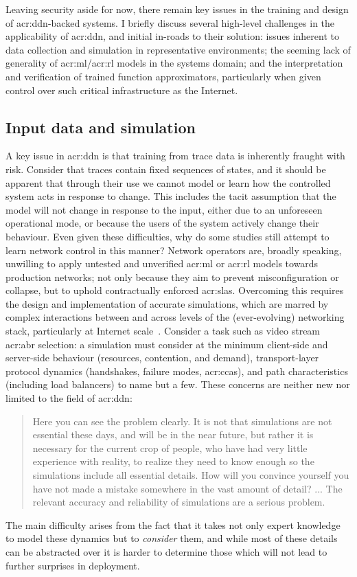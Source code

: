 Leaving security aside for now, there remain key issues in the training and design of \gls{acr:ddn}-backed systems.
I briefly discuss several high-level challenges in the applicability of \gls{acr:ddn}, and initial in-roads to their solution: issues inherent to data collection and simulation in representative environments; the seeming lack of generality of \gls{acr:ml}/\gls{acr:rl} models in the systems domain; and the interpretation and verification of trained function approximators, particularly when given control over such critical infrastructure as the Internet.

\subsection{Input data and simulation}
A key issue in \gls{acr:ddn} is that training from trace data is inherently fraught with risk.
Consider that traces contain fixed sequences of states, and it should be apparent that through their use we cannot model or learn how the controlled system acts in response to change.
This includes the tacit assumption that the model will not change in response to the input, either due to an unforeseen operational mode, or because the users of the system actively change their behaviour.
Even given these difficulties, why do some studies still attempt to learn network control in this manner?
Network operators are, broadly speaking, unwilling to apply untested and unverified \gls{acr:ml} or \gls{acr:rl} models towards production networks; not only because they aim to prevent misconfiguration or collapse, but to uphold contractually enforced \glspl{acr:sla}.
Overcoming this requires the design and implementation of accurate simulations, which are marred by complex interactions between and across levels of the (ever-evolving) networking stack, particularly at Internet scale~\parencite{DBLP:journals/ton/X01c}.
Consider a task such as video stream \gls{acr:abr} selection: a simulation must consider at the minimum client-side and server-side behaviour (resources, contention, and demand), transport-layer protocol dynamics (handshakes, failure modes, \glspl{acr:cca}), and path characteristics (including load balancers) to name but a few.
These concerns are neither new nor limited to the field of \gls{acr:ddn}:
\begin{quotation}
\noindent
Here you can see the problem clearly.
It is not that simulations are not essential these days, and will be in the near future, but rather it is necessary for the current crop of people, who have had very little experience with reality, to realize they need to know enough so the simulations include all essential details.
How will you convince yourself you have not made a mistake somewhere in the vast amount of detail?
... The relevant accuracy and reliability of simulations are a serious problem.\\
\strut\hfill\parencite[p. 248]{hamming-art-of-scieng} 
\end{quotation}
The main difficulty arises from the fact that it takes not only expert knowledge to model these dynamics but to \emph{consider} them, and while most of these details can be abstracted over it is harder to determine those which will not lead to further surprises in deployment.

